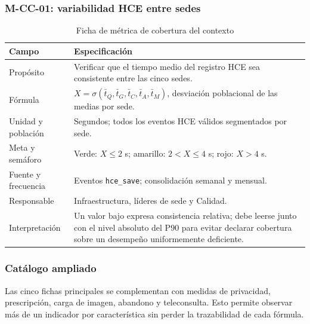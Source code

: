\subsubsection{M-CC-01: variabilidad HCE entre sedes}

\begin{table}[H]
\centering
\caption{Ficha de métrica de cobertura del contexto}
\begin{tabularx}{\textwidth}{p{3.3cm}Y}
\toprule
Campo & Especificación \\
\midrule
Propósito & Verificar que el tiempo medio del registro HCE sea consistente entre las cinco sedes. \\
Fórmula & $X=\sigma(\bar t_Q,\bar t_G,\bar t_C,\bar t_A,\bar t_M)$, desviación poblacional de las medias por sede. \\
Unidad y población & Segundos; todos los eventos HCE válidos segmentados por sede. \\
Meta y semáforo & Verde: $X\leq2$ s; amarillo: $2<X\leq4$ s; rojo: $X>4$ s. \\
Fuente y frecuencia & Eventos \texttt{hce\_save}; consolidación semanal y mensual. \\
Responsable & Infraestructura, líderes de sede y Calidad. \\
Interpretación & Un valor bajo expresa consistencia relativa; debe leerse junto con el nivel absoluto del P90 para evitar declarar cobertura sobre un desempeño uniformemente deficiente. \\
\bottomrule
\end{tabularx}
\end{table}

\subsubsection{Catálogo ampliado}

Las cinco fichas principales se complementan con medidas de privacidad, prescripción, carga de imagen, abandono y teleconsulta. Esto permite observar más de un indicador por característica sin perder la trazabilidad de cada fórmula.

